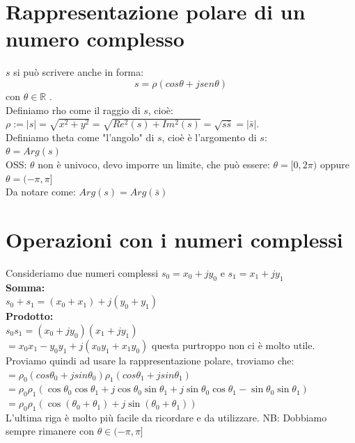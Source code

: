 \section{Rappresentazione polare di un numero complesso}

$s$ si può scrivere anche in forma:
\begin{equation*}
 s = \rho (cos\theta + j sen\theta)
\end{equation*}
con $\theta \in \mathbb{R}$ .\\
Definiamo rho come il raggio di $s$, cioè: \\
$\rho := |s| = \sqrt{x^{2}+y^{2}} = \sqrt{ Re^{2}(s)+Im^{2}(s)} = \sqrt{s\bar{s}} = |\bar{s}|$.\\
Definiamo theta come "l'angolo" di $s$, cioè è l'argomento di $s$: \\
$ \theta = Arg(s)$ \\
OSS: $\theta$ non è univoco, devo imporre un limite, che può essere:
$\theta = [0,2\pi)$ oppure $\theta = (-\pi, \pi] $ \\
Da notare come: $Arg(s) = Arg(\bar{s})$


\section{Operazioni con i numeri complessi}
Consideriamo due numeri complessi $ s_{0} = x_{0}+jy_{0} $ e $ s_{1} = x_{1}+jy_{1} $ \\

\textbf{Somma:} \\
$ s_{0} + s_{1} = ( x_{0}+x_{1} ) + j (y_{0} + y_{1}) $ \\

\textbf{Prodotto:} \\
$ s_{0} s_{1} = ( x_{0} + j y_{0})( x_{1} + j y_{1}) $ \\
$ = x_{0} x_{1} - y_{0} y_{1} + j (x_{0} y_{1} + x_{1} y_{0} ) $ questa purtroppo non ci è molto utile.\\
Proviamo quindi ad usare la rappresentazione polare, troviamo che: \\
$ = \rho_{0} (cos\theta_{0} + j sin\theta_{0})\rho_{1} (cos\theta_{1} + j sin\theta_{1}) $ \\
$ = \rho_{0} \rho_{1} ( \cos\theta_{0} \cos\theta_{1} + j \cos\theta_{0} \sin\theta_{1} + j \sin\theta_{0} \cos\theta_{1}-\sin\theta_{0} \sin\theta_{1}) $ \\
$ = \rho_{0} \rho_{1} ( \cos (\theta_{0} + \theta_{1}) + j \sin ( \theta_{0} + \theta_{1} )) $ \\
L'ultima riga è molto più facile da ricordare e da utilizzare.
NB: Dobbiamo sempre rimanere con $\theta \in (-\pi , \pi]$

